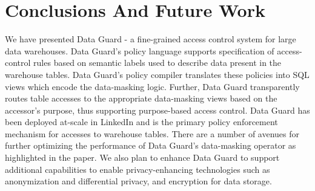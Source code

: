 \section{Conclusions And Future Work}
We have presented Data Guard - a fine-grained access control system for large data warehouses. Data Guard's policy language supports specification of access-control rules based on semantic labels used to describe data present in the warehouse tables. Data Guard's policy compiler translates these policies into SQL views which encode the data-masking logic. Further, Data Guard transparently routes table accesses to the appropriate data-masking views based on the accessor's purpose, thus supporting purpose-based access control. Data Guard has been deployed at-scale in LinkedIn and is the primary policy enforcement mechanism for accesses to warehouse tables. There are a number of avenues for further optimizing the performance of Data Guard's data-masking operator as highlighted in the paper. We also plan to enhance Data Guard to support additional capabilities to enable privacy-enhancing technologies such as anonymization and differential privacy, and encryption for data storage. 